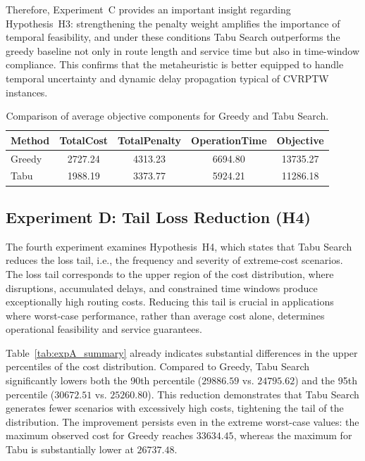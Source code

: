 Therefore, Experiment~C provides an important insight regarding Hypothesis~H3: strengthening the penalty weight amplifies the importance of temporal feasibility, and under these conditions Tabu Search outperforms the greedy baseline not only in route length and service time but also in time-window compliance. This confirms that the metaheuristic is better equipped to handle temporal uncertainty and dynamic delay propagation typical of CVRPTW instances.


\begin{table}[ht]
\renewcommand{\arraystretch}{1.3}
\centering
\caption{Comparison of average objective components for Greedy and Tabu Search.}
\label{tab:avg_penalty_components}
\begin{tabular}{l|c|c|c|c}
\hline\hline
Method & TotalCost & TotalPenalty & OperationTime & Objective \\
\hline\hline
Greedy & 2727.24 & 4313.23 & 6694.80 & 13735.27 \\ \hline
Tabu   & 1988.19 & 3373.77 & 5924.21 & 11286.18 \\
\hline\hline
\end{tabular}
\end{table}













\subsection{Experiment D: Tail Loss Reduction (H4)}

The fourth experiment examines Hypothesis~H4, which states that Tabu Search reduces the loss tail, i.e., the frequency and severity of extreme-cost scenarios. The loss tail corresponds to the upper region of the cost distribution, where disruptions, accumulated delays, and constrained time windows produce exceptionally high routing costs. Reducing this tail is crucial in applications where worst-case performance, rather than average cost alone, determines operational feasibility and service guarantees.

Table~\ref{tab:expA_summary} already indicates substantial differences in the upper percentiles of the cost distribution. Compared to Greedy, Tabu Search significantly lowers both the 90th percentile ($29886.59$ vs. $24795.62$) and the 95th percentile ($30672.51$ vs. $25260.80$). This reduction demonstrates that Tabu Search generates fewer scenarios with excessively high costs, tightening the tail of the distribution. The improvement persists even in the extreme worst-case values: the maximum observed cost for Greedy reaches $33634.45$, whereas the maximum for Tabu is substantially lower at $26737.48$. 

